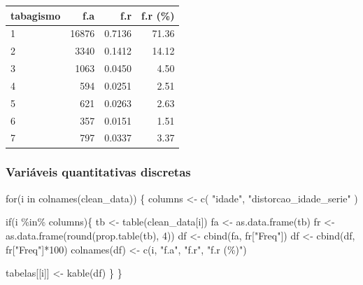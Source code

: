 \documentclass[
]{article}
\newenvironment{Shaded}{\begin{snugshade}}{\end{snugshade}}
\newcommand{\ControlFlowTok}[1]{\textcolor[rgb]{0.00,0.23,0.31}{#1}}
\newcommand{\DecValTok}[1]{\textcolor[rgb]{0.68,0.00,0.00}{#1}}
\newcommand{\FunctionTok}[1]{\textcolor[rgb]{0.28,0.35,0.67}{#1}}
\newcommand{\NormalTok}[1]{\textcolor[rgb]{0.00,0.23,0.31}{#1}}
\newcommand{\OtherTok}[1]{\textcolor[rgb]{0.00,0.23,0.31}{#1}}
\newcommand{\SpecialCharTok}[1]{\textcolor[rgb]{0.37,0.37,0.37}{#1}}
\newcommand{\StringTok}[1]{\textcolor[rgb]{0.13,0.47,0.30}{#1}}
\begin{document}
\begin{longtable}[]{@{}lrrr@{}}
\toprule()
tabagismo & f.a & f.r & f.r (\%) \\
\midrule()
\endhead
1 & 16876 & 0.7136 & 71.36 \\
2 & 3340 & 0.1412 & 14.12 \\
3 & 1063 & 0.0450 & 4.50 \\
4 & 594 & 0.0251 & 2.51 \\
5 & 621 & 0.0263 & 2.63 \\
6 & 357 & 0.0151 & 1.51 \\
7 & 797 & 0.0337 & 3.37 \\
\bottomrule()
\end{longtable}

\hypertarget{variuxe1veis-quantitativas-discretas}{%
\subsubsection{Variáveis quantitativas
discretas}\label{variuxe1veis-quantitativas-discretas}}

\begin{Shaded}
\begin{Highlighting}[]
\ControlFlowTok{for}\NormalTok{(i }\ControlFlowTok{in} \FunctionTok{colnames}\NormalTok{(clean\_data)) \{}
\NormalTok{  columns }\OtherTok{\textless{}{-}} \FunctionTok{c}\NormalTok{(}
    \StringTok{"idade"}\NormalTok{,}
    \StringTok{"distorcao\_idade\_serie"}
\NormalTok{  )}
  
  \ControlFlowTok{if}\NormalTok{(i }\SpecialCharTok{\%in\%}\NormalTok{ columns)\{}
\NormalTok{    tb }\OtherTok{\textless{}{-}} \FunctionTok{table}\NormalTok{(clean\_data[i])}
\NormalTok{    fa }\OtherTok{\textless{}{-}} \FunctionTok{as.data.frame}\NormalTok{(tb)}
\NormalTok{    fr }\OtherTok{\textless{}{-}} \FunctionTok{as.data.frame}\NormalTok{(}\FunctionTok{round}\NormalTok{(}\FunctionTok{prop.table}\NormalTok{(tb), }\DecValTok{4}\NormalTok{))}
\NormalTok{    df }\OtherTok{\textless{}{-}} \FunctionTok{cbind}\NormalTok{(fa, fr[}\StringTok{"Freq"}\NormalTok{])}
\NormalTok{    df }\OtherTok{\textless{}{-}} \FunctionTok{cbind}\NormalTok{(df, fr[}\StringTok{"Freq"}\NormalTok{]}\SpecialCharTok{*}\DecValTok{100}\NormalTok{)}
    \FunctionTok{colnames}\NormalTok{(df) }\OtherTok{\textless{}{-}} \FunctionTok{c}\NormalTok{(i, }\StringTok{"f.a"}\NormalTok{, }\StringTok{"f.r"}\NormalTok{, }\StringTok{"f.r (\%)"}\NormalTok{)}

\NormalTok{    tabelas[[i]] }\OtherTok{\textless{}{-}} \FunctionTok{kable}\NormalTok{(df)}
\NormalTok{  \}}
\NormalTok{\}}
\end{Highlighting}
\end{Shaded}
\end{document}

